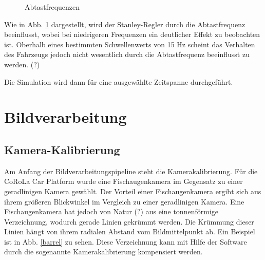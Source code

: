 \documentclass[arbeit=studie,oneside,BCOR=12mm]{ArbeitRST}
\begin{document}
\begin{figure}[h]
    \caption{Abtastfrequenzen}
    \label{sampling}
\end{figure}

Wie in Abb. \ref{sampling} dargestellt, wird der Stanley-Regler durch die Abtastfrequenz
beeinflusst, wobei bei niedrigeren Frequenzen ein deutlicher Effekt zu
beobachten ist. Oberhalb eines bestimmten Schwellenwerts von 15 Hz scheint das
Verhalten des Fahrzeugs jedoch nicht wesentlich durch die Abtastfrequenz
beeinflusst zu werden. (?)

Die Simulation wird dann für eine ausgewählte Zeitspanne durchgeführt. 



\chapter{Bildverarbeitung}
\section{Kamera-Kalibrierung}

Am Anfang der Bildverarbeitungspipeline steht die Kamerakalibrierung. Für die
CoRoLa Car Platform wurde eine Fischaugenkamera im Gegensatz zu einer
geradlinigen Kamera gewählt. Der Vorteil einer Fischaugenkamera ergibt sich aus
ihrem größeren Blickwinkel im Vergleich zu einer geradlinigen Kamera. Eine
Fischaugenkamera hat jedoch von Natur (?) aus eine tonnenförmige Verzeichnung,
wodurch gerade Linien gekrümmt werden. Die Krümmung dieser Linien hängt von
ihrem radialen Abstand vom Bildmittelpunkt ab. Ein Beispiel ist in Abb.
\ref{barrel} zu sehen. Diese Verzeichnung kann mit Hilfe der Software durch die
sogenannte Kamerakalibrierung kompensiert werden. \\
\end{document}
